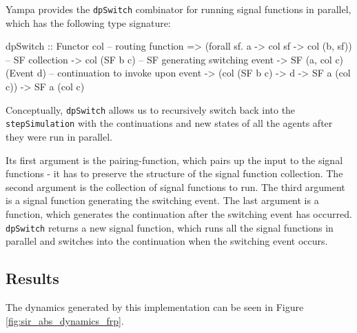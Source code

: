 Yampa provides the \texttt{dpSwitch} combinator for running signal functions in parallel, which has the following type signature:

\begin{HaskellCode}
dpSwitch :: Functor col
         -- routing function
         => (forall sf. a -> col sf -> col (b, sf))
         -- SF collection
         -> col (SF b c)
         -- SF generating switching event     
         -> SF (a, col c) (Event d)
         -- continuation to invoke upon event           
         -> (col (SF b c) -> d -> SF a (col c))
         -> SF a (col c)
\end{HaskellCode}

Conceptually, \texttt{dpSwitch} allows us to recursively switch back into the \\ \texttt{stepSimulation} with the continuations and new states of all the agents after they were run in parallel. 

Its first argument is the pairing-function, which pairs up the input to the signal functions - it has to preserve the structure of the signal function collection. The second argument is the collection of signal functions to run. The third argument is a signal function generating the switching event. The last argument is a function, which generates the continuation after the switching event has occurred. \texttt{dpSwitch} returns a new signal function, which runs all the signal functions in parallel and switches into the continuation when the switching event occurs. %

\subsection{Results}
\label{sub:timedriven_results}

The dynamics generated by this implementation can be seen in Figure \ref{fig:sir_abs_dynamics_frp}. 

